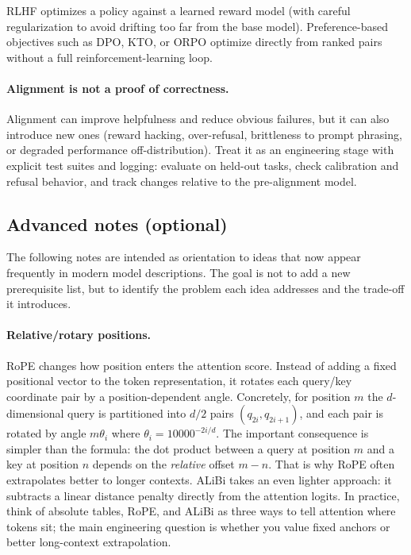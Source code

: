RLHF optimizes a policy against a learned reward model (with careful regularization to avoid drifting too far from the base model). Preference-based objectives such as DPO, KTO, or ORPO optimize directly from ranked pairs without a full reinforcement-learning loop.

\paragraph{Alignment is not a proof of correctness.}
Alignment can improve helpfulness and reduce obvious failures, but it can also introduce new ones (reward hacking, over-refusal, brittleness to prompt phrasing, or degraded performance off-distribution). Treat it as an engineering stage with explicit test suites and logging: evaluate on held-out tasks, check calibration and refusal behavior, and track changes relative to the pre-alignment model.

\subsection{Advanced notes (optional)}
\label{sec:transformers_advanced_attention_and_efficiency_notes_snapshot}
The following notes are intended as orientation to ideas that now appear frequently in modern model descriptions. The goal is not to add a new prerequisite list, but to identify the problem each idea addresses and the trade-off it introduces.

\paragraph{Relative/rotary positions.}
RoPE \citep{Su2021RoPE} changes how position enters the attention score. Instead of adding a fixed positional vector to the token representation, it rotates each query/key coordinate pair by a position-dependent angle. Concretely, for position \(m\) the \(d\)-dimensional query is partitioned into \(d/2\) pairs \((q_{2i}, q_{2i+1})\), and each pair is rotated by angle \(m\theta_i\) where \(\theta_i = 10000^{-2i/d}\). The important consequence is simpler than the formula: the dot product between a query at position \(m\) and a key at position \(n\) depends on the \emph{relative} offset \(m-n\). That is why RoPE often extrapolates better to longer contexts. ALiBi \citep{Press2022ALiBi} takes an even lighter approach: it subtracts a linear distance penalty directly from the attention logits. In practice, think of absolute tables, RoPE, and ALiBi as three ways to tell attention where tokens sit; the main engineering question is whether you value fixed anchors or better long-context extrapolation.


